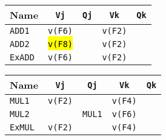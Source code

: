 \begin{enumerate}
    \begin{minipage}[t]{0.43\textwidth}
        \centering
        \begin{adjustbox}{width={\textwidth},totalheight={\textheight},keepaspectratio}
            \begin{tabular}{@{} l | c c c c @{}}
                \toprule
                Name            & \texttt{Vj}           & \texttt{Qj}                       & \texttt{Vk}           & \texttt{Qk}           \\
                \midrule
                \texttt{ADD1}   & \texttt{v(F6)}        &                                   & \texttt{v(F2)}        &                       \\ [.3em]
                \texttt{ADD2}   & \hl{\texttt{v(F8)}}   &                                   & \texttt{v(F2)}        &                       \\
                \cmidrule{1-5}
                \texttt{ExADD}  & \texttt{v(F6)}        &                                   & \texttt{v(F2)}        &                       \\
                \bottomrule
            \end{tabular}
        \end{adjustbox}
    \end{minipage}
    \hfill
    \begin{minipage}[t]{0.43\textwidth}
        \centering
        \begin{adjustbox}{width={\textwidth},totalheight={\textheight},keepaspectratio}
            \begin{tabular}{@{} l | c c c c @{}}
                \toprule
                Name            & \texttt{Vj}           & \texttt{Qj}           & \texttt{Vk}           & \texttt{Qk}   \\
                \midrule
                \texttt{MUL1}   & \texttt{v(F2)}        &                       & \texttt{v(F4)}        &               \\ [.3em]
                \texttt{MUL2}   &                       & \texttt{MUL1}         & \texttt{v(F6)}        &               \\
                \cmidrule{1-5}
                \texttt{ExMUL}  & \texttt{v(F2)}        &                       & \texttt{v(F4)}        &               \\
                \bottomrule
            \end{tabular}
        \end{adjustbox}
    \end{minipage}


\end{enumerate}
